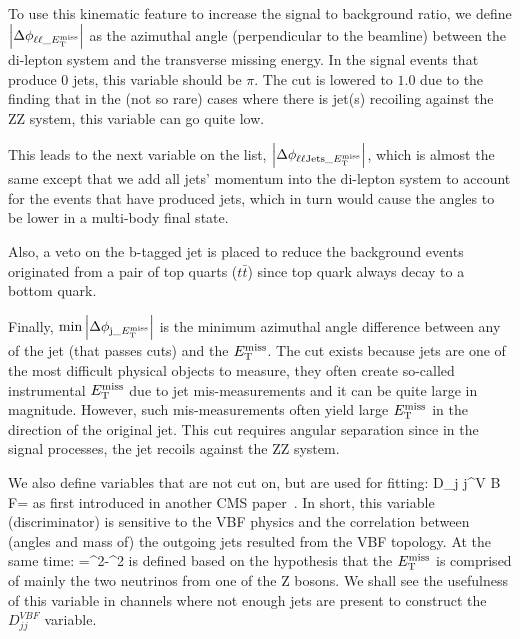 To use this kinematic feature to increase the signal to background ratio, we define 
$\abs{\Delta\phi_{\ell\ell\_E_{\mathrm{T}}^{\mathrm{miss}}}}$ as the azimuthal angle (perpendicular to 
the beamline) between the di-lepton system and the transverse missing energy. In the
signal events that produce 0 jets, this variable should be $\pi$. The cut is lowered to $1.0$ 
due to the finding that in the (not so rare) cases where there is jet(s) recoiling against
the ZZ system, this variable can go quite low.

This leads to the next variable on the list, $\abs{\Delta\phi_{\ell\ell\mathrm{Jets}\_E_{\mathrm{T}}^{\mathrm{miss}}}}$, which
is almost the same except that we add all jets' momentum into the di-lepton system to account
for the events that have produced jets, which in turn would cause the angles to be lower in
a multi-body final state.

Also, a veto on the b-tagged jet is placed to reduce the background events originated from a pair
of top quarts ($t\bar{t}$) since top quark always decay to a bottom quark.

Finally, $\min{\abs{ \Delta\phi_{\mathrm{j}\_E_{\mathrm{T}}^{\mathrm{miss}}}}}$ is the minimum azimuthal angle difference between
any of the jet (that passes cuts) and the $E_{\mathrm{T}}^{\mathrm{miss}}$. The cut exists because jets are one of the 
most difficult physical objects to measure, they often create so-called instrumental $E_{\mathrm{T}}^{\mathrm{miss}}$ due to jet
mis-measurements and it can be quite large in magnitude. However, such mis-measurements often yield large
$E_{\mathrm{T}}^{\mathrm{miss}}$ in the direction of the original jet. This cut requires angular separation since in the signal processes,
the jet recoils against the ZZ system.

We also define variables that are not cut on, but are used for fitting:
\be
D_{j j}^{V B F}=
\ee
as first introduced in another CMS paper~\cite{djjvbf}. In short, this variable (discriminator) is sensitive
to the VBF physics and the correlation between (angles and mass of) the outgoing jets resulted from the
VBF topology. At the same time:
\be
\mtzz={}^2-^{2}
\ee
is defined based on the hypothesis that the $E_{\mathrm{T}}^{\mathrm{miss}}$ is comprised of mainly the two neutrinos
from one of the Z bosons. We shall see the usefulness of this variable in channels where
not enough jets are present to construct the $D_{j j}^{V B F}$ variable.

